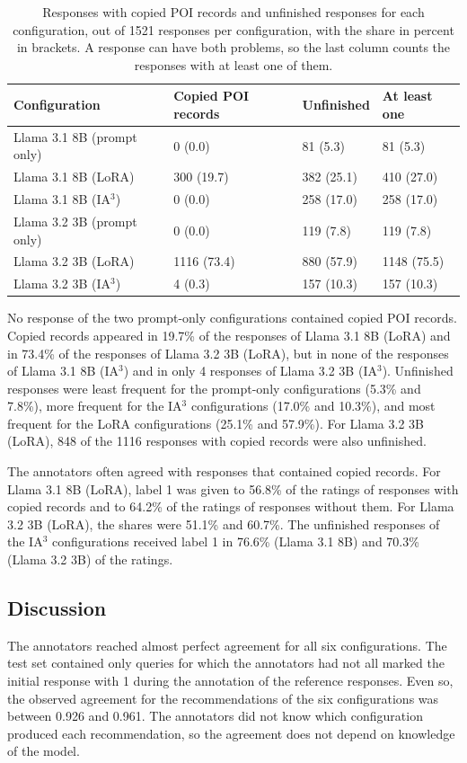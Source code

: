 \documentclass[journal,article,submit,pdftex,moreauthors]{Definitions/mdpi}
\begin{document}
\begin{table}[H]
\caption{Responses with copied POI records and unfinished responses for each configuration, out of 1521 responses per configuration, with the share in percent in brackets. A response can have both problems, so the last column counts the responses with at least one of them.\label{tab:outputs}}
\begin{tabularx}{\textwidth}{lCCC}
\toprule
Configuration & Copied POI records & Unfinished & At least one\\
\midrule
Llama 3.1 8B (prompt only) & 0 (0.0) & 81 (5.3) & 81 (5.3)\\
Llama 3.1 8B (LoRA) & 300 (19.7) & 382 (25.1) & 410 (27.0)\\
Llama 3.1 8B (IA$^3$) & 0 (0.0) & 258 (17.0) & 258 (17.0)\\
Llama 3.2 3B (prompt only) & 0 (0.0) & 119 (7.8) & 119 (7.8)\\
Llama 3.2 3B (LoRA) & 1116 (73.4) & 880 (57.9) & 1148 (75.5)\\
Llama 3.2 3B (IA$^3$) & 4 (0.3) & 157 (10.3) & 157 (10.3)\\
\bottomrule
\end{tabularx}
\end{table}

No response of the two prompt-only configurations contained copied POI records. Copied records appeared in 19.7\% of the responses of Llama 3.1 8B (LoRA) and in 73.4\% of the responses of Llama 3.2 3B (LoRA), but in none of the responses of Llama 3.1 8B (IA$^3$) and in only 4 responses of Llama 3.2 3B (IA$^3$). Unfinished responses were least frequent for the prompt-only configurations (5.3\% and 7.8\%), more frequent for the IA$^3$ configurations (17.0\% and 10.3\%), and most frequent for the LoRA configurations (25.1\% and 57.9\%). For Llama 3.2 3B (LoRA), 848 of the 1116 responses with copied records were also unfinished.

The annotators often agreed with responses that contained copied records. For Llama 3.1 8B (LoRA), label 1 was given to 56.8\% of the ratings of responses with copied records and to 64.2\% of the ratings of responses without them. For Llama 3.2 3B (LoRA), the shares were 51.1\% and 60.7\%. The unfinished responses of the IA$^3$ configurations received label 1 in 76.6\% (Llama 3.1 8B) and 70.3\% (Llama 3.2 3B) of the ratings.

\subsection{Discussion}\label{sec:discussion}
The annotators reached almost perfect agreement for all six configurations. The test set contained only queries for which the annotators had not all marked the initial response with 1 during the annotation of the reference responses. Even so, the observed agreement for the recommendations of the six configurations was between 0.926 and 0.961. The annotators did not know which configuration produced each recommendation, so the agreement does not depend on knowledge of the model.
\end{document}
